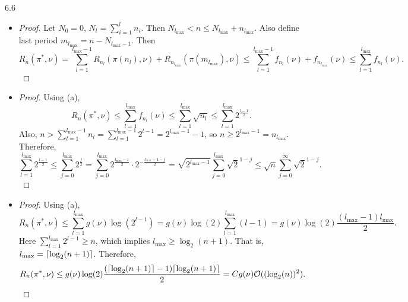 \documentclass[10pt]{article}
\theoremstyle{definition}
\newenvironment{solution*}[1]{%
  \IfBlankTF{#1}
    {\renewcommand{\themanualsolutioninner}{\unskip}}
    {\renewcommand\themanualsolutioninner{#1}}%
  \manualsolutioninner
}{\endmanualsolutioninner}
\DeclarePairedDelimiter{\ceil}{\lceil}{\rceil}
\begin{document}
\begin{solution*}{6.6}
    \leavevmode
    \begin{itemize}
        \item[(a)] 
        \begin{proof}
            Let $N_0 = 0$, $N_l = \sum_{i=1}^l n_i$. Then $N_{l_{\max}} < n \leq N_{l_{\max}} + n_{l_{\max}}$.
            Also define last period $m_{l_{\max}} = n - N_{l_{\max}-1}$.
            Then
            \begin{equation*}
                R_n(\pi^*, \nu) = \sum_{l=1}^{l_{\max}-1} R_{n_l}(\pi(n_l), \nu) + R_{n_{l_{\max}}}(\pi(m_{l_{\max}}), \nu) \leq \sum_{l=1}^{l_{\max}-1} f_{n_l} (\nu) + f_{n_{l_{\max}}} (\nu) \leq \sum_{l=1}^{l_{\max}} f_{n_l} (\nu).
            \end{equation*}
        \end{proof}
        \item[(b)]
        \begin{proof}
            Using (a),
            \begin{equation*}
                R_n (\pi^*, \nu) \leq \sum_{l=1}^{l_{\max}} f_{n_l} (\nu) \leq \sum_{l=1}^{l_{\max}}\sqrt{n_l} \leq \sum_{l=1}^{l_{\max}}{2^{\frac{l-1}{2}}}.
            \end{equation*}
            Also, $n > \sum_{l=1}^{l_{\max}-1} n_l = \sum_{l=1}^{l_{\max}-1} 2^{l-1} = 2^{l_{\max}-1} - 1$, so $n \geq 2^{l_{\max}-1} = n_{l_{\max}}$. Therefore,
            \begin{equation*}
                \sum_{l=1}^{l_{\max}} 2^{\frac{l-1}{2}} \leq \sum_{j=0}^{l_{\max}} 2^{\frac{j}{2}} = \sum_{j=0}^{l_{\max}} 2^{\frac{l_{\max}-1}{2}} \cdot 2^{-\frac{l_{\max}-1-j}{2}}
                = \sqrt{2^{l_{\max}-1}} \sum_{j=0}^{l_{\max}} \sqrt{2}^{1-j}
                \leq \sqrt{n} \sum_{j=0}^{\infty} \sqrt{2}^{1-j}.
            \end{equation*}
        \end{proof}
        \item[(c)]
        \begin{proof}
            Using (a),
            \begin{equation*}
                R_n (\pi^*, \nu) \leq \sum_{l=1}^{l_{\max}} g(\nu) \log(2^{l-1}) 
                = g(\nu)\log(2) \sum_{l=1}^{l_{\max}} (l-1) 
                = g(\nu)\log(2) \frac{(l_{\max}-1)l_{\max}}{2}.
            \end{equation*}
            Here $\sum_{l=1}^{l_{\max}} 2^{l-1} \geq n$, which implies $l_{\max} \geq \log_2(n+1)$. That is, $l_{\max} = \ceil{\log_2(n+1)}$. Therefore,
            \begin{equation*}
                R_n (\pi^*, \nu) \leq g(\nu)\log(2) \frac{(\ceil{\log_2(n+1)}-1)\ceil{\log_2(n+1)}}{2} = Cg(\nu)\mathcal{O}((\log_2(n))^2).
            \end{equation*}
        \end{proof}
    \end{itemize}
\end{solution*}
\end{document}
